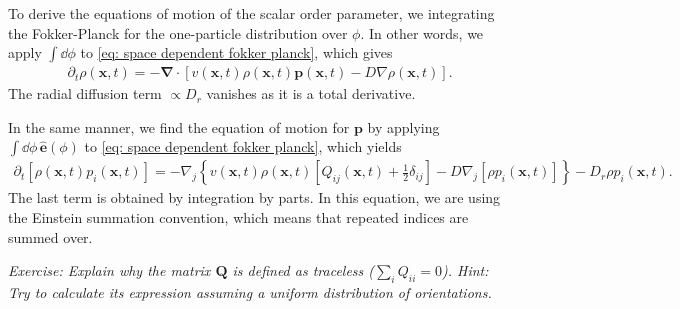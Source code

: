 To derive the equations of motion of the scalar order parameter, we integrating the Fokker-Planck for the one-particle distribution over $\phi$.
In other words, we apply $\int \dd \phi$ to \autoref{eq: space dependent fokker planck}, which gives
%
\begin{align}\label{eq: density FP}
    \partial_t \rho(\bm x, t)
    = 
    - \bm \nabla \cdot [ v(\bm x, t) \rho(\bm x, t) \bm p(\bm x, t) - D \nabla \rho(\bm x, t)].
\end{align}
%
The radial diffusion term $\propto D_r$ vanishes as it is a total derivative.


In the same manner, we find the equation of motion for $\bm p$ by applying $\int \dd\phi \, \hat{\bm e}(\phi)$ to \autoref{eq: space dependent fokker planck}, which yields
%
\begin{align} \label{eq: polarity FP}
    \partial_t [\rho(\bm x, t)  p_i(\bm x, t)]
    =
    -
    \nabla_{j}
    \left\{
        v(\bm x, t) \rho(\bm x, t) \left[ Q_{ij}(\bm x, t) + \frac{ 1 }{ 2 }  \delta_{ij}\right]
        - D \nabla_j [\rho p_i(\bm x, t)]
    \right\}
    - D_r \rho p_i(\bm x, t).
\end{align}
%
The last term is obtained by integration by parts.
In this equation, we are using the Einstein summation convention, which means that repeated indices are summed over.

{\it Exercise: Explain why the matrix $\bm Q$ is defined as traceless (${\sum}_i Q_{ii} = 0$). Hint: Try to calculate its expression assuming a uniform distribution of orientations.}

